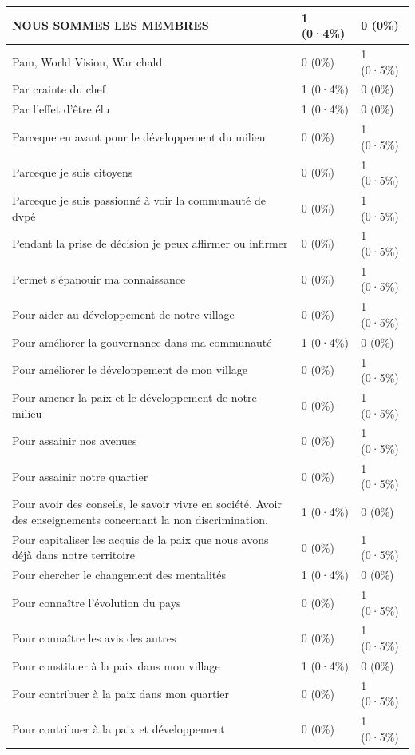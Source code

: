 \documentclass[
]{book}
\begin{document}
\begin{tabular}{l|l|l}
\hline
NOUS SOMMES LES MEMBRES & 1 (0·4\%) & 0 (0\%)\\
\hline
Pam, World Vision, War chald & 0 (0\%) & 1 (0·5\%)\\
\hline
Par crainte du chef & 1 (0·4\%) & 0 (0\%)\\
\hline
Par l'effet d'être élu & 1 (0·4\%) & 0 (0\%)\\
\hline
Parceque en avant pour le développement du milieu & 0 (0\%) & 1 (0·5\%)\\
\hline
Parceque je suis citoyens & 0 (0\%) & 1 (0·5\%)\\
\hline
Parceque je suis passionné à voir la communauté de dvpé & 0 (0\%) & 1 (0·5\%)\\
\hline
Pendant la prise de décision je peux affirmer ou infirmer & 0 (0\%) & 1 (0·5\%)\\
\hline
Permet s'épanouir ma connaissance & 0 (0\%) & 1 (0·5\%)\\
\hline
Pour aider au développement de notre village & 0 (0\%) & 1 (0·5\%)\\
\hline
Pour améliorer la gouvernance dans ma communauté & 1 (0·4\%) & 0 (0\%)\\
\hline
Pour améliorer le développement de mon village & 0 (0\%) & 1 (0·5\%)\\
\hline
Pour amener la paix et le développement de notre milieu & 0 (0\%) & 1 (0·5\%)\\
\hline
Pour assainir nos avenues & 0 (0\%) & 1 (0·5\%)\\
\hline
Pour assainir notre quartier & 0 (0\%) & 1 (0·5\%)\\
\hline
Pour avoir des conseils, le savoir vivre en société. Avoir  des enseignements concernant la non discrimination. & 1 (0·4\%) & 0 (0\%)\\
\hline
Pour capitaliser les acquis de la  paix que nous avons déjà dans notre territoire & 0 (0\%) & 1 (0·5\%)\\
\hline
Pour chercher le changement des mentalités & 1 (0·4\%) & 0 (0\%)\\
\hline
Pour connaître l'évolution du pays & 0 (0\%) & 1 (0·5\%)\\
\hline
Pour connaître les avis des autres & 0 (0\%) & 1 (0·5\%)\\
\hline
Pour constituer à la paix dans mon village & 1 (0·4\%) & 0 (0\%)\\
\hline
Pour contribuer à la paix dans mon quartier & 0 (0\%) & 1 (0·5\%)\\
\hline
Pour contribuer à la paix et développement & 0 (0\%) & 1 (0·5\%)\\

\end{tabular}
\end{document}
